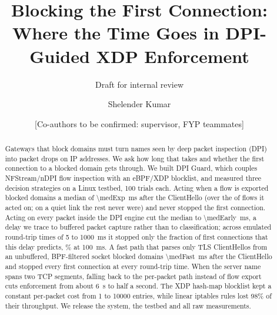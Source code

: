 \documentclass[sigconf,nonacm]{acmart}
\newcommand{\sys}{DPI Guard}
\begin{document}
\title{Blocking the First Connection: Where the Time Goes in DPI-Guided XDP Enforcement}
\ifdefined\REVIEWCOPY\subtitle{Draft for internal review}\fi

\author{Shelender Kumar}
\author{[Co-authors to be confirmed: supervisor, FYP teammates]}

\begin{abstract}
Gateways that block domains must turn names seen by deep packet inspection (DPI) into packet
drops on IP addresses. We ask how long that takes and whether the first connection to a blocked
domain gets through. We built \sys{}, which couples NFStream/nDPI flow inspection with an
eBPF/XDP blocklist, and measured three decision strategies on a Linux testbed, 100 trials each.
Acting when a flow is exported blocked domains a median of \SI{\medExp}{\milli\second} after the
ClientHello (over the \enforcedExp{} of \nExp{} flows it acted on; on a quiet link the rest never
were) and never stopped the first connection. Acting on every packet inside the DPI engine cut the median to \SI{\medEarly}{\milli\second},
a delay we trace to buffered packet capture rather than to classification; across emulated
round-trip times of 5 to \SI{1000}{\milli\second} it stopped only the fraction of first
connections that this delay predicts, \sweepEarlyhundred\% at \SI{100}{\milli\second}. A fast
path that parses only TLS ClientHellos from an unbuffered, BPF-filtered socket blocked domains
\SI{\medFast}{\milli\second} after the ClientHello and stopped every first connection at every
round-trip time. When the server name spans two TCP segments, falling back to the per-packet
path instead of flow export cuts enforcement from about \SI{6}{\second} to half a second. The XDP
hash-map blocklist kept a constant per-packet cost from 1 to \num{10000} entries, while linear
iptables rules lost 98\% of their throughput. We release the system, the testbed and all raw
measurements.
\end{abstract}

\end{document}
